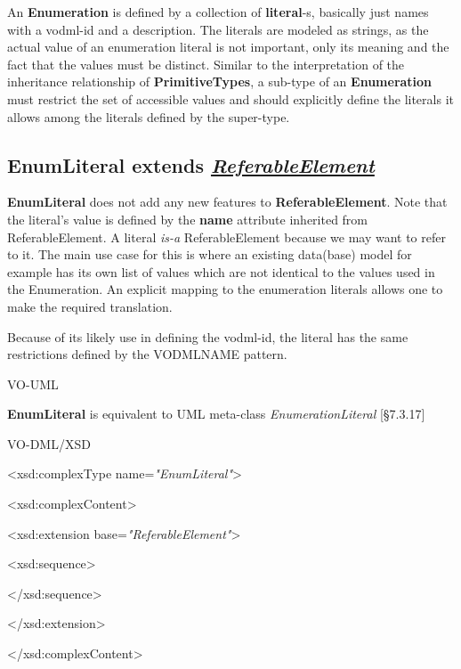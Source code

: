 \documentclass[10pt,a4paper]{ivoa}
\begin{document}
An \textbf{Enumeration} is defined by a collection of
\textbf{literal}-s, basically just names with a vodml-id and a
description. The literals are modeled as strings, as the actual value of
an enumeration literal is not important, only its meaning and the fact
that the values must be distinct. Similar to the interpretation of the
inheritance relationship of \textbf{PrimitiveTypes}, a sub-type of an
\textbf{Enumeration} must restrict the set of accessible values and
should explicitly define the literals it allows among the literals
defined by the super-type.

\hypertarget{enumliteral-extends-referableelement}{%
\subsection{\texorpdfstring{EnumLiteral extends
\protect\hyperlink{referableelement}{\emph{ReferableElement}}}{EnumLiteral extends ReferableElement}}\label{enumliteral-extends-referableelement}}

\textbf{EnumLiteral} does not add any new features to
\textbf{ReferableElement}. Note that the literal's value is defined by
the \textbf{name} attribute inherited from ReferableElement. A literal
\emph{is-a} ReferableElement because we may want to refer to it. The
main use case for this is where an existing data(base) model for example
has its own list of values which are not identical to the values used in
the Enumeration. An explicit mapping to the enumeration literals allows
one to make the required translation.

Because of its likely use in defining the vodml-id, the literal has the
same restrictions defined by the VODMLNAME pattern.

VO-UML

\textbf{EnumLiteral} is equivalent to UML meta-class
\emph{EnumerationLiteral} {[}§7.3.17{]}

VO-DML/XSD

\textless xsd:complexType name=\emph{"EnumLiteral"}\textgreater{}

\textless xsd:complexContent\textgreater{}

\textless xsd:extension base=\emph{"ReferableElement"}\textgreater{}

\textless xsd:sequence\textgreater{}

\textless/xsd:sequence\textgreater{}

\textless/xsd:extension\textgreater{}

\textless/xsd:complexContent\textgreater{}
\end{document}

